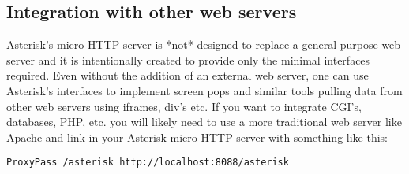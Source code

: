 \subsection{Integration with other web servers}

Asterisk's micro HTTP server is *not* designed to replace a general
purpose web server and it is intentionally created to provide only the
minimal interfaces required.  Even without the addition of an external
web server, one can use Asterisk's interfaces to implement screen pops
and similar tools pulling data from other web servers using iframes,
div's etc.  If you want to integrate CGI's, databases, PHP, etc.  you
will likely need to use a more traditional web server like Apache and
link in your Asterisk micro HTTP server with something like this:
\begin{astlisting}
\begin{verbatim}
ProxyPass /asterisk http://localhost:8088/asterisk
\end{verbatim}
\end{astlisting}

